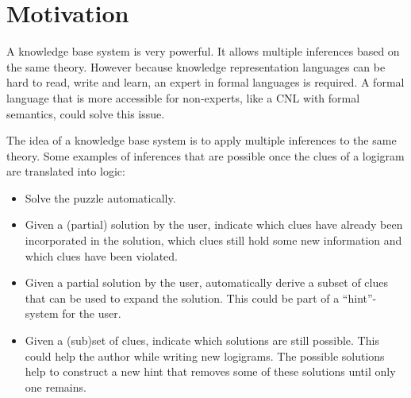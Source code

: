 \section{Motivation}
A knowledge base system is very powerful. It allows multiple inferences based on the same theory. However because knowledge representation languages can be hard to read, write and learn, an expert in formal languages is required. A formal language that is more accessible for non-experts, like a CNL with formal semantics, could solve this issue.

The idea of a knowledge base system is to apply multiple inferences to the same theory. Some examples of inferences that are possible once the clues of a logigram are translated into logic:
\begin{itemize}
  \item Solve the puzzle automatically.
  \item Given a (partial) solution by the user, indicate which clues have already been incorporated in the solution, which clues still hold some new information and which clues have been violated.
  \item Given a partial solution by the user, automatically derive a subset of clues that can be used to expand the solution. This could be part of a ``hint''-system for the user.
  \item Given a (sub)set of clues, indicate which solutions are still possible. This could help the author while writing new logigrams. The possible solutions help to construct a new hint that removes some of these solutions until only one remains.
\end{itemize}
